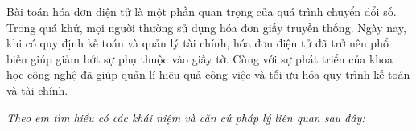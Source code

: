 Bài toán hóa đơn điện tử là một phần quan trọng của quá trình chuyển đổi số. Trong quá khứ, mọi người thường sử dụng hóa đơn giấy truyền thống. Ngày nay, khi có quy định kế toán và quản lý tài chính, hóa đơn điện tử đã trở nên phổ biến giúp giảm bớt sự phụ thuộc vào giấy tờ. Cùng với sự phát triển của khoa học công nghệ đã giúp quản lí hiệu quả công việc và tối ưu hóa quy trình kế toán và tài chính.





 
\textit{Theo em tìm hiểu có các khái niệm và căn cứ pháp lý liên quan sau đây:} 


